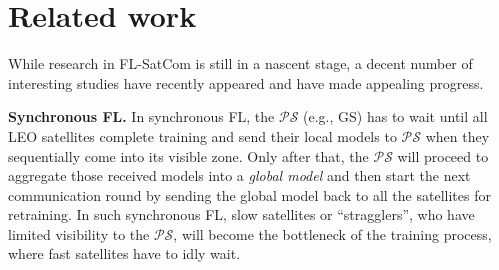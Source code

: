 \documentclass[letter,journal]{IEEEtran}
\newcommand{\sref}[1]{Section~\ref{#1}}
\begin{document}
\section{Related work}\label{sec:releated}
While research in FL-SatCom is still in a nascent stage, a decent number of interesting studies have recently appeared \cite{chen2022satellite, razmi,happaper,lin2022federated, chen2023edge, wu2022dsfl, e2023opt,razmi2022ground, razmi2022scheduling,so2022fedspace,wang2022fl, mAsyFLEO, wu2023fedgsm, elone,elmahallawy2023secure} and have made appealing progress. 

\textbf{Synchronous FL.} In synchronous FL, the $\mathcal{PS}$ (e.g., GS) has to wait until all LEO satellites complete training and send their local models to $\mathcal{PS}$ when they sequentially come into its visible zone. Only after that, the $\mathcal {PS}$ will proceed to aggregate those received models into a \textit{global model} and then start the next communication round by sending the global model back to all the satellites for retraining. In such synchronous FL, slow satellites or ``stragglers'', who have limited visibility to the $\mathcal {PS}$, will become the bottleneck of the training process, where fast satellites have to idly wait.
\end{document}
